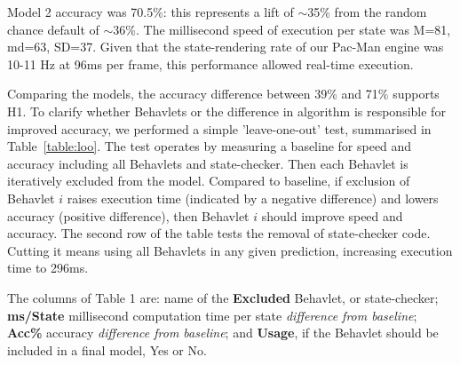 \documentclass[conference]{IEEEtran}
\begin{document}
Model 2 accuracy was 70.5\%: this represents a lift of $\sim$35\% from the random chance default of $\sim$36\%. The millisecond speed of execution per state was M=81, md=63, SD=37. Given that the state-rendering rate of our Pac-Man engine was 10-11 Hz at 96ms per frame, this performance allowed real-time execution.

Comparing the models, the accuracy difference between 39\% and 71\% supports \textsf{H1}. To clarify whether Behavlets or the difference in algorithm is responsible for improved accuracy, we performed a simple 'leave-one-out' test, summarised in Table~\ref{table:loo}. The test operates by measuring a baseline for speed and accuracy including all Behavlets and state-checker. Then each Behavlet is iteratively excluded from the model. Compared to baseline, if exclusion of Behavlet $i$ raises execution time (indicated by a negative difference) and lowers accuracy (positive difference), then Behavlet $i$ should improve speed and accuracy. The second row of the table tests the removal of state-checker code. Cutting it means using all Behavlets in any given prediction, increasing execution time to 296ms.

The columns of Table 1 are: name of the \textbf{Excluded} Behavlet, or state-checker; \textbf{ms/State} millisecond computation time per state \textit{difference from baseline}; \textbf{Acc\%} accuracy \textit{difference from baseline}; and \textbf{Usage}, if the Behavlet should be included in a final model, Yes or No.
\end{document}

